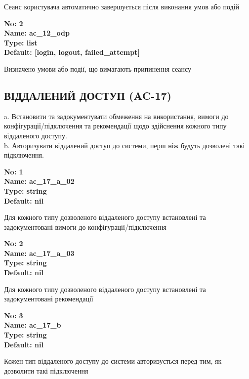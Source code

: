 \documentclass{article}
\begin{document}
{\footnotesize Сеанс користувача автоматично завершується після виконання умов або подій}


{\footnotesize\bfseries
No: 2\\
Name: ac\_\allowbreak{}12\_\allowbreak{}odp\\
Type: list\\
Default: [\textquotedbl{}login\textquotedbl{}, \textquotedbl{}logout\textquotedbl{}, \textquotedbl{}failed\_\allowbreak{}attempt\textquotedbl{}]
}

{\footnotesize Визначено умови або події, що вимагають припинення сеансу}




\subsection{ВІДДАЛЕНИЙ ДОСТУП (AC-17)}
a. Встановити та задокументувати обмеження на використання, вимоги до конфігурації/підключення та рекомендації щодо здійснення кожного типу віддаленого доступу.\\ 
b. Авторизувати віддалений доступ до системи, перш ніж будуть дозволені такі підключення.

\vspace{10pt}
{\footnotesize\bfseries
No: 1\\
Name: ac\_\allowbreak{}17\_\allowbreak{}a\_\allowbreak{}02\\
Type: string\\
Default: nil
}

{\footnotesize Для кожного типу дозволеного віддаленого доступу встановлені та задокументовані вимоги до конфігурації/підключення}


{\footnotesize\bfseries
No: 2\\
Name: ac\_\allowbreak{}17\_\allowbreak{}a\_\allowbreak{}03\\
Type: string\\
Default: nil
}

{\footnotesize Для кожного типу дозволеного віддаленого доступу встановлені та задокументовані рекомендації}


{\footnotesize\bfseries
No: 3\\
Name: ac\_\allowbreak{}17\_\allowbreak{}b\\
Type: string\\
Default: nil
}

{\footnotesize Кожен тип віддаленого доступу до системи авторизується перед тим, як дозволити такі підключення}
\end{document}

